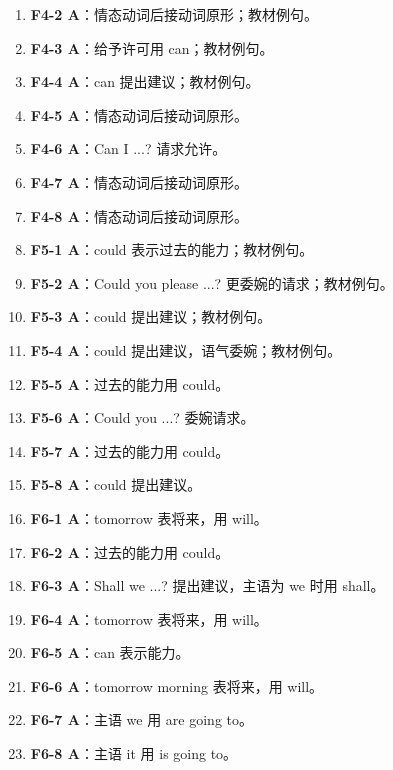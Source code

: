 \documentclass[11pt,a4paper]{ctexart}
\begin{document}
\begin{enumerate}[leftmargin=1.6em,itemsep=2pt]
\item \textbf{F4-2 A}：情态动词后接动词原形；教材例句。
\item \textbf{F4-3 A}：给予许可用 can；教材例句。
\item \textbf{F4-4 A}：can 提出建议；教材例句。
\item \textbf{F4-5 A}：情态动词后接动词原形。
\item \textbf{F4-6 A}：Can I ...? 请求允许。
\item \textbf{F4-7 A}：情态动词后接动词原形。
\item \textbf{F4-8 A}：情态动词后接动词原形。
\item \textbf{F5-1 A}：could 表示过去的能力；教材例句。
\item \textbf{F5-2 A}：Could you please ...? 更委婉的请求；教材例句。
\item \textbf{F5-3 A}：could 提出建议；教材例句。
\item \textbf{F5-4 A}：could 提出建议，语气委婉；教材例句。
\item \textbf{F5-5 A}：过去的能力用 could。
\item \textbf{F5-6 A}：Could you ...? 委婉请求。
\item \textbf{F5-7 A}：过去的能力用 could。
\item \textbf{F5-8 A}：could 提出建议。
\item \textbf{F6-1 A}：tomorrow 表将来，用 will。
\item \textbf{F6-2 A}：过去的能力用 could。
\item \textbf{F6-3 A}：Shall we ...? 提出建议，主语为 we 时用 shall。
\item \textbf{F6-4 A}：tomorrow 表将来，用 will。
\item \textbf{F6-5 A}：can 表示能力。
\item \textbf{F6-6 A}：tomorrow morning 表将来，用 will。
\item \textbf{F6-7 A}：主语 we 用 are going to。
\item \textbf{F6-8 A}：主语 it 用 is going to。
\end{enumerate}
\end{document}
